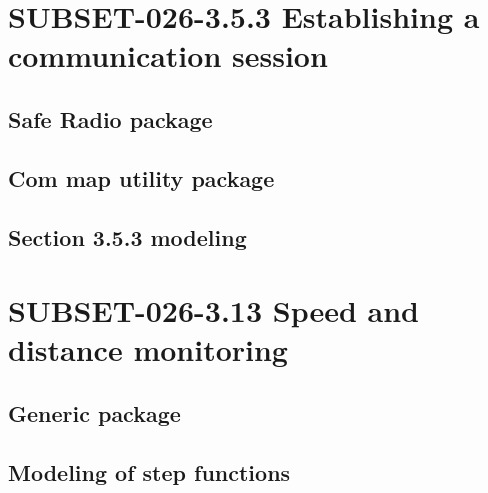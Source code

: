 \documentclass{template/openetcs_report}
\begin{document}




\section{SUBSET-026-3.5.3 Establishing a communication session}

\subsection{Safe Radio package}




\subsection{Com map utility package}



\subsection{Section 3.5.3 modeling}




\section{SUBSET-026-3.13 Speed and distance monitoring}

\subsection{Generic package}




\subsection{Modeling of step functions}
\label{sec:step-function}




\end{document}
